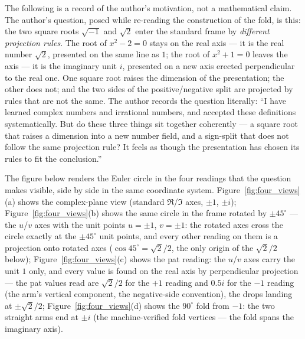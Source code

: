 \documentclass{article}
\begin{document}
The following is a record of the author's motivation, not a mathematical
claim. The author's question, posed while re-reading the construction of
the fold, is this: the two square roots $\sqrt{-1}$ and $\sqrt2$ enter
the standard frame by \emph{different projection rules}. The root of
$x^2-2=0$ stays on the real axis --- it is the real number $\sqrt2$,
presented on the same line as $1$; the root of $x^2+1=0$ leaves the axis
--- it is the imaginary unit $i$, presented on a new axis erected
perpendicular to the real one. One square root raises the dimension of
the presentation; the other does not; and the two sides of the
positive/negative split are projected by rules that are not the same.
The author records the question literally: ``I have learned complex
numbers and irrational numbers, and accepted these definitions
systematically. But do these three things sit together coherently --- a
square root that raises a dimension into a new number field, and a
sign-split that does not follow the same projection rule? It feels as
though the presentation has chosen its rules to fit the conclusion.''

The figure below renders the Euler circle in the four readings that
the question makes visible, side by side in the same coordinate system.
Figure~\ref{fig:four_views}(a) shows the complex-plane view (standard
$\Re$/$\Im$ axes, $\pm1$, $\pm i$); Figure~\ref{fig:four_views}(b)
shows the same circle in the frame rotated by $\pm45^\circ$ --- the
$u$/$v$ axes with the unit points $u{=}\pm1$, $v{=}\pm1$: the rotated
axes cross the circle exactly at the $\pm45^\circ$ unit points, and
every other reading on them is a projection onto rotated axes
($\cos45^\circ=\sqrt2/2$, the only origin of the $\sqrt2/2$ below);
Figure~\ref{fig:four_views}(c) shows the pat reading: the $u$/$v$
axes carry the unit $1$ only, and every value is found on the real axis
by perpendicular projection --- the pat values read are $\sqrt2/2$
for the $+1$ reading and $0.5i$ for the $-1$ reading (the arm's
vertical component, the negative-side convention), the drops landing
at $\pm\sqrt2/2$; Figure~\ref{fig:four_views}(d) shows the
$90^\circ$ fold from $-1$: the two straight arms end at $\pm i$ (the
machine-verified fold vertices --- the fold spans the imaginary axis).
\end{document}
